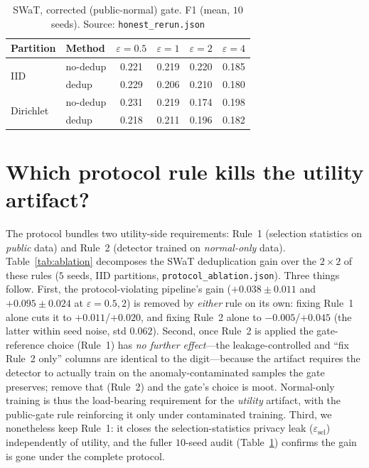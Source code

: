 \documentclass{article}
\providecommand{\botrule}{\bottomrule}%
\begin{document}
\begin{table}[h]\centering
\caption{SWaT, corrected (public-normal) gate. F1 (mean, $10$ seeds). Source:
\texttt{honest\_rerun.json}}\label{tab:honest}
\begin{tabular}{@{}llcccc@{}}
\toprule
Partition & Method & $\varepsilon{=}0.5$ & $\varepsilon{=}1$ & $\varepsilon{=}2$ & $\varepsilon{=}4$ \\
\midrule
\multirow{2}{*}{IID} & no-dedup & 0.221 & 0.219 & 0.220 & 0.185 \\
 & dedup & 0.229 & 0.206 & 0.210 & 0.180 \\
\midrule
\multirow{2}{*}{Dirichlet} & no-dedup & 0.231 & 0.219 & 0.174 & 0.198 \\
 & dedup & 0.218 & 0.211 & 0.196 & 0.182 \\
\botrule
\end{tabular}
\end{table}

\section{Which protocol rule kills the utility artifact?}\label{supp:ablation}
The protocol bundles two utility-side requirements: Rule~1 (selection statistics on
\emph{public} data) and Rule~2 (detector trained on \emph{normal-only} data).
Table~\ref{tab:ablation} decomposes the SWaT deduplication gain over the $2\times2$ of
these rules ($5$ seeds, IID partitions, \texttt{protocol\_ablation.json}). Three things
follow. First, the protocol-violating pipeline's gain ($+0.038\pm0.011$ and $+0.095\pm0.024$ at
$\varepsilon{=}0.5,2$) is removed by \emph{either} rule on its own: fixing Rule~1 alone
cuts it to $+0.011$/$+0.020$, and fixing Rule~2 alone to $-0.005$/$+0.045$ (the latter
within seed noise, std $0.062$). Second, once Rule~2 is applied the gate-reference
choice (Rule~1) has \emph{no further effect}---the leakage-controlled and ``fix Rule~2 only'' columns are identical to the digit---because the artifact requires the detector to
actually train on the anomaly-contaminated samples the gate preserves; remove that
(Rule~2) and the gate's choice is moot. Normal-only training is thus the load-bearing
requirement for the \emph{utility} artifact, with the public-gate rule reinforcing it
only under contaminated training. Third, we nonetheless keep Rule~1: it closes the
selection-statistics privacy leak ($\varepsilon_{\text{sel}}$) independently of utility,
and the fuller $10$-seed audit (Table~\ref{tab:honest}) confirms the gain is gone under
the complete protocol.
\end{document}
